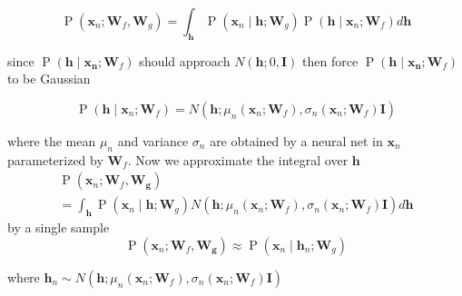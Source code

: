 \documentclass[12pt]{article}
\begin{document}
            $$ \operatorname{P}\left(\boldsymbol{x}_{n} ; \boldsymbol{W}_{f},
            \boldsymbol{W}_{g}\right)=\int_{\boldsymbol{h}} \operatorname{P}\left(\boldsymbol{x}_{n} \mid
            \boldsymbol{h} ; \boldsymbol{W}_{g}\right) \operatorname{P}\left(\boldsymbol{h} \mid \boldsymbol{x}_{n} ;
            \boldsymbol{W}_{f}\right) d \boldsymbol{h} $$

            since $\operatorname{P}\left(\boldsymbol{h} \mid \boldsymbol{x}_{\boldsymbol{n}} ;
            \boldsymbol{W}_{f}\right)$ should approach $N(\boldsymbol{h} ; 0, \boldsymbol{I})$
            then force $\operatorname{P}\left(\boldsymbol{h} \mid \boldsymbol{x}_{\boldsymbol{n}} ; \boldsymbol{W}_{f}\right)$ to be Gaussian
            
            $$ \operatorname{P}\left(\boldsymbol{h} \mid \boldsymbol{x}_{n} ;
            \boldsymbol{W}_{f}\right)=N\left(\boldsymbol{h} ; \mu_{n}\left(\boldsymbol{x}_{n} ;
            \boldsymbol{W}_{f}\right), \sigma_{n}\left(\boldsymbol{x}_{n} ; \boldsymbol{W}_{f}\right)
            \boldsymbol{I}\right) $$
            
            where the mean $\mu_n$ and variance $\sigma_n$ are obtained by a neural net in $\boldsymbol{x}_n$
            parameterized by $\boldsymbol{W}_f$. Now we approximate the integral over $\boldsymbol{h}$
            $$
            \begin{array}{l}
            \operatorname{P}\left(\boldsymbol{x}_{n} ; \boldsymbol{W}_{f}, \boldsymbol{W}_{\boldsymbol{g}}\right) \\
            =\int_{\boldsymbol{h}} \operatorname{P}\left(\boldsymbol{x}_{n} \mid \boldsymbol{h} ; \boldsymbol{W}_{g}\right) N\left(\boldsymbol{h} ;
             \mu_{n}\left(\boldsymbol{x}_{n} ; \boldsymbol{W}_{f}\right), \sigma_{n}\left(\boldsymbol{x}_{n} ; \boldsymbol{W}_{f}\right) 
             \boldsymbol{I}\right) d \boldsymbol{h}
            \end{array}
            $$
            by a single sample
            $$ \operatorname{P}\left(\boldsymbol{x}_{n} ; \boldsymbol{W}_{f}, \boldsymbol{W}_{\boldsymbol{g}}\right)
            \approx \operatorname{P}\left(\boldsymbol{x}_{n} \mid \boldsymbol{h}_{n} ; \boldsymbol{W}_{g}\right) $$

            where $\boldsymbol{h}_{n} \sim N\left(\boldsymbol{h} ; \mu_{n}\left(\boldsymbol{x}_{n} ;
            \boldsymbol{W}_{f}\right), \sigma_{n}\left(\boldsymbol{x}_{n} ; \boldsymbol{W}_{f}\right)
            \boldsymbol{I}\right)$
        
\end{document}
